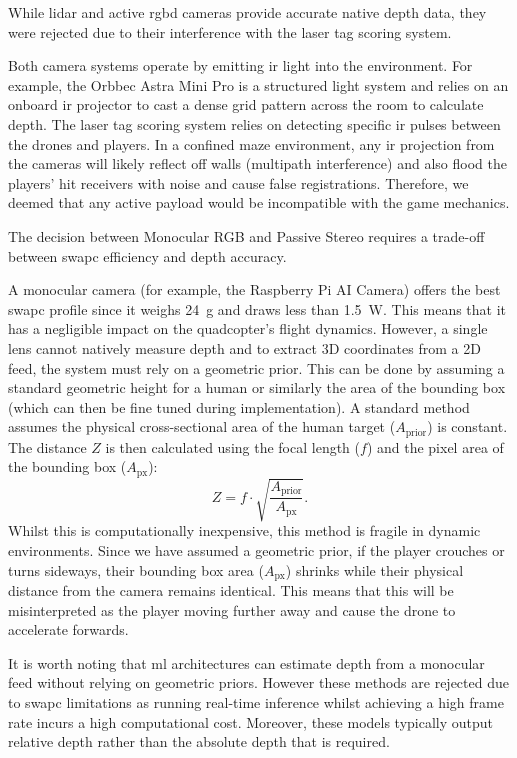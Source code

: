 \documentclass{report_template_oxford}
\begin{document}
While \gls{lidar} and active \gls{rgbd} cameras provide accurate native depth data, they were rejected due to their interference with the laser tag scoring system. 

Both camera systems operate by emitting \gls{ir} light into the environment. For example, the Orbbec Astra Mini Pro is a structured light system and relies on an onboard \gls{ir} projector to cast a dense grid pattern across the room to calculate depth. The laser tag scoring system relies on detecting specific \gls{ir} pulses between the drones and players. In a confined maze environment, any \gls{ir} projection from the cameras will likely reflect off walls (multipath interference) and also flood the players' hit receivers with noise and cause false registrations. Therefore, we deemed that any active payload would be incompatible with the game mechanics. 

The decision between Monocular RGB and Passive Stereo requires a trade-off between \gls{swapc} efficiency and depth accuracy. 

A monocular camera (for example, the Raspberry Pi AI Camera) offers the best \gls{swapc} profile since it weighs 24~g and draws less than 1.5~W. This means that it has a negligible impact on the quadcopter's flight dynamics. However, a single lens cannot natively measure depth and to extract 3D coordinates from a 2D feed, the system must rely on a geometric prior. This can be done by assuming a standard geometric height for a human or similarly the area of the bounding box (which can then be fine tuned during implementation). A standard method assumes the physical cross-sectional area of the human target ($A_\text{prior}$) is constant. The distance $Z$ is then calculated using the focal length ($f$) and the pixel area of the bounding box ($A_\text{px}$):
\begin{equation}
    Z = f \cdot \sqrt{\frac{A_\text{prior}}{A_\text{px}}}.
\end{equation}
Whilst this is computationally inexpensive, this method is fragile in dynamic environments. Since we have assumed a geometric prior, if the player crouches or turns sideways, their bounding box area ($A_\text{px}$) shrinks while their physical distance from the camera remains identical. This means that this will be misinterpreted as the player moving further away and cause the drone to accelerate forwards.

It is worth noting that \gls{ml} architectures can estimate depth from a monocular feed without relying on geometric priors. However these methods are rejected due to \gls{swapc} limitations as running real-time inference whilst achieving a high frame rate incurs a high computational cost. Moreover, these models typically output relative depth rather than the absolute depth that is required.
\end{document}

